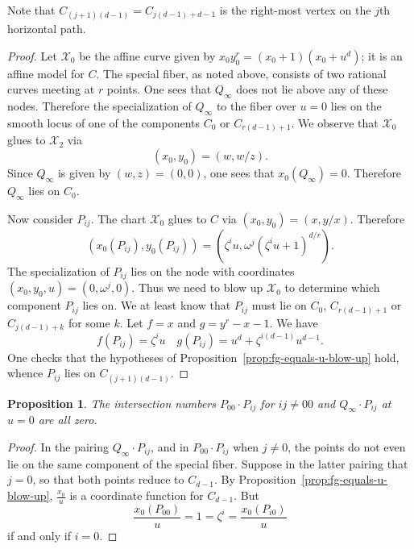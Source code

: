 \documentclass[pagesize,paper=letter]{scrartcl}
\newtheorem{proposition}[thm]{Proposition}
\theoremstyle{definition}
\theoremstyle{remark}
\def\sX{\mathcal{X}}
\begin{document}
Note that $C_{(j+1)(d-1)} = C_{j(d-1) + d-1}$ is the right-most vertex on the $j$th horizontal path.

\begin{proof}
  Let $\sX_0$ be the affine curve given by $x_0 y_0^r = (x_0+1)(x_0+u^d)$; it is an affine model for $C$. The special fiber, as noted above, consists of two rational curves meeting at $r$ points. One sees that $Q_\infty$ does not lie above any of these nodes. Therefore the specialization of $Q_\infty$ to the fiber over $u = 0$ lies on the smooth locus of one of the components $C_0$ or $C_{r(d-1)+1}$. We observe that $\sX_0$ glues to $\sX_2$ via
  \[
  (x_0, y_0) = (w, w/z).
  \]
  Since $Q_\infty$ is given by $(w, z) = (0, 0)$, one sees that $x_0(Q_\infty) = 0$. Therefore $Q_\infty$ lies on $C_0$.

  Now consider $P_{ij}$. The chart $\sX_0$ glues to $C$ via $(x_0, y_0) = (x, y/x)$. Therefore
  \[
  (x_0(P_{ij}), y_0(P_{ij})) = (\zeta^i u, \omega^j(\zeta^iu + 1)^{d/r}).
  \]
  The specialization of $P_{ij}$ lies on the node with coordinates $(x_0, y_0, u) = (0, \omega^j, 0)$. Thus we need to blow up $\sX_0$ to determine which component $P_{ij}$ lies on. We at least know that $P_{ij}$ must lie on $C_0$, $C_{r(d-1)+1}$ or $C_{j(d-1) + k}$ for some $k$. Let $f = x$ and $g = y^r - x - 1$. We have
  \[
  f(P_{ij}) = \zeta^i u \quad g(P_{ij}) = u^d + \zeta^{i(d-1)} u^{d-1}.
  \]
  One checks that the hypotheses of Proposition~\ref{prop:fg-equals-u-blow-up} hold, whence $P_{ij}$ lies on $C_{(j+1)(d-1)}$.
\end{proof}

\begin{proposition}\label{prop:local-intersections-u-0}
  The intersection numbers $P_{00} \cdot P_{ij}$ for $ij \neq 00$ and $Q_{\infty} \cdot P_{ij}$ at $u = 0$ are all zero.
\end{proposition}

\begin{proof}
  In the pairing $Q_\infty \cdot P_{ij}$, and in $P_{00} \cdot P_{ij}$ when $j \neq 0$, the points do not even lie on the same component of the special fiber. Suppose in the latter pairing that $j = 0$, so that both points reduce to $C_{d-1}$. By Proposition~\ref{prop:fg-equals-u-blow-up}, $\frac{x_0}{u}$ is a coordinate function for $C_{d-1}$. But
  \[
  \frac{x_0(P_{00})}{u} = 1 = \zeta^i = \frac{x_0(P_{i0})}{u}
  \]
  if and only if $i = 0$.
\end{proof}
\end{document}
